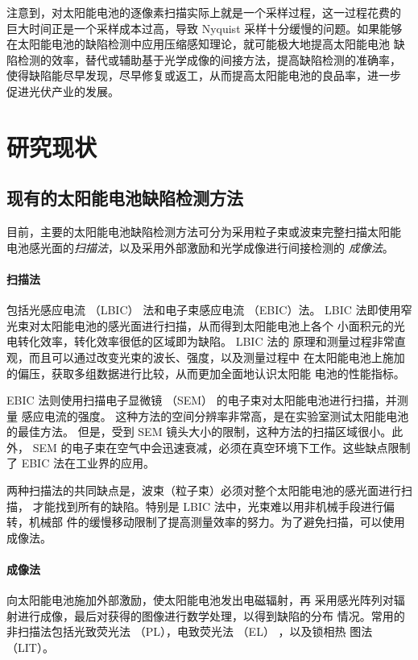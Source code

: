 注意到，对太阳能电池的逐像素扫描实际上就是一个采样过程，这一过程花费的
巨大时间正是一个采样成本过高，导致 Nyquist 采样十分缓慢的问题。如果能够
在太阳能电池的缺陷检测中应用压缩感知理论，就可能极大地提高太阳能电池
缺陷检测的效率，替代或辅助基于光学成像的间接方法，提高缺陷检测的准确率，
使得缺陷能尽早发现，尽早修复或返工，从而提高太阳能电池的良品率，进一步
促进光伏产业的发展。

\section{研究现状}

\subsection{现有的太阳能电池缺陷检测方法}

目前，主要的太阳能电池缺陷检测方法可分为采用粒子束或波束完整扫描太阳能
电池感光面的\emph{扫描法}，以及采用外部激励和光学成像进行间接检测的
\emph{成像法}。

\paragraph{扫描法} 包括光感应电流 （LBIC） 法和电子束感应电流 （EBIC）法。
LBIC 法即使用窄光束对太阳能电池的感光面进行扫描，从而得到太阳能电池上各个
小面积元的光电转化效率，转化效率很低的区域即为缺陷。\cite{LBIC} LBIC 法的
原理和测量过程非常直观，而且可以通过改变光束的波长、强度，以及测量过程中
在太阳能电池上施加的偏压，获取多组数据进行比较，从而更加全面地认识太阳能
电池的性能指标。\cite{LBICEnc}

EBIC 法则使用扫描电子显微镜 （SEM） 的电子束对太阳能电池进行扫描，并测量
感应电流的强度。\cite{EBIC}
这种方法的空间分辨率非常高，是在实验室测试太阳能电池的最佳方法。
但是，受到 SEM 镜头大小的限制，这种方法的扫描区域很小。此外，
SEM 的电子束在空气中会迅速衰减，必须在真空环境下工作。这些缺点限制了 EBIC
法在工业界的应用。

两种扫描法的共同缺点是，波束（粒子束）必须对整个太阳能电池的感光面进行扫描，
才能找到所有的缺陷。特别是 LBIC 法中，光束难以用非机械手段进行偏转，机械部
件的缓慢移动限制了提高测量效率的努力。为了避免扫描，可以使用成像法。

\paragraph{成像法} 向太阳能电池施加外部激励，使太阳能电池发出电磁辐射，再
采用感光阵列对辐射进行成像，最后对获得的图像进行数学处理，以得到缺陷的分布
情况。常用的非扫描法包括光致荧光法 （PL），电致荧光法 （EL） ，以及锁相热
图法（LIT）。

